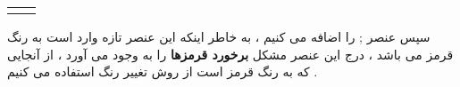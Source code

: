 \documentclass[12pt]{article}
\begin{document}
\begin{latin}
\begin{center}
  \bgroup
  \def\arraystretch{1.5}%
  \begin{tabular}{ C C  }
     &
     \\ 
  \end{tabular}
  \egroup
\end{center}
\end{latin}






سپس عنصر 
\tikz {} ;
را اضافه می کنیم ، به خاطر اینکه این عنصر تازه وارد است به رنگ قرمز می باشد ، درج این عنصر مشکل 
\textbf{
برخورد قرمزها  
}
را به وجود می آورد ، از آنجایی که 
به رنگ قرمز است از روش تغییر رنگ استفاده می کنیم .
\end{document}
